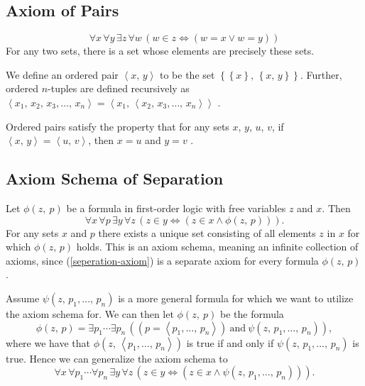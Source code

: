 \documentclass[../../main.tex]{subfiles}
\begin{document}
\subsection{Axiom of Pairs}\label{ZF2}
$$\forall x\, \forall y\, \exists z\, \forall w\, \left( w \in z \iff \left(w = x \vee w = y \right)\right)$$
For any two sets, there is a set whose elements are precisely these sets.
 
We define an ordered pair $\left<x,\, y\right>$ to be the set $\left\{\left\{x\right\},\, \left\{x,\, y\right\}\right\}$.
Further, ordered $n$-tuples are defined recursively as $\left<x_1,\, x_2,\, x_3,\ldots,\, x_n\right> = \left<x_1,\, \left<x_2,\, x_3,\ldots,\, x_n\right>\right>$ \cite[\S 4.3, pp.76, 79-80]{Gol17}.

Ordered pairs satisfy the property that for any sets $x$, $y$, $u$, $v$, if $\left<x,\, y\right> = \left<u,\, v\right>$, then $x = u$ and $y = v$ \cite[Theorem 4.2]{Gol17}.

\subsection{Axiom Schema of Separation}\label{ZF3}
Let $\phi(z,\ p)$ be a formula in first-order logic with free variables $z$ and $x$. Then
\begin{equation}\label{seperation-axiom}
    \forall x\, \forall p\, \exists y\, \forall z\, \left(z \in y \iff \left(z \in x \wedge \phi(z,\, p)\right)\right).
\end{equation}
For any sets $x$ and $p$ there exists a unique set consisting of all elements $z$ in $x$ for which $\phi(z,\, p)$ holds.
This is an axiom schema, meaning an infinite collection of axioms, since (\ref{seperation-axiom}) is a separate axiom for every formula $\phi(z,\, p)$.

Assume $\psi(z,\, p_1,\ldots,\, p_n)$ is a more general formula for which we want to utilize the axiom schema for.
We can then let $\phi(z,\ p)$ be the formula
$$\phi(z,\, p) = \exists p_1 \cdots \exists p_n\, \left(\left(p = \left<p_1,\ldots,\, p_n\right>\right) \ \text{and} \ \psi(z,\, p_1,\ldots,\, p_n)\right),$$
where we have that $\phi(z,\, \left<p_1,\ldots,\, p_n\right>)$ is true if and only if $\psi(z,\, p_1,\ldots,\, p_n)$ is true.
Hence we can generalize the axiom schema to 
\begin{equation}\label{general-seperation-axiom}
    \forall x\, \forall p_1 \cdots \forall p_n\, \exists y\, \forall z\, \left(z \in y \iff \left(z \in x \wedge \psi(z,\, p_1,\ldots,\, p_n)\right)\right).
\end{equation}
\end{document}
